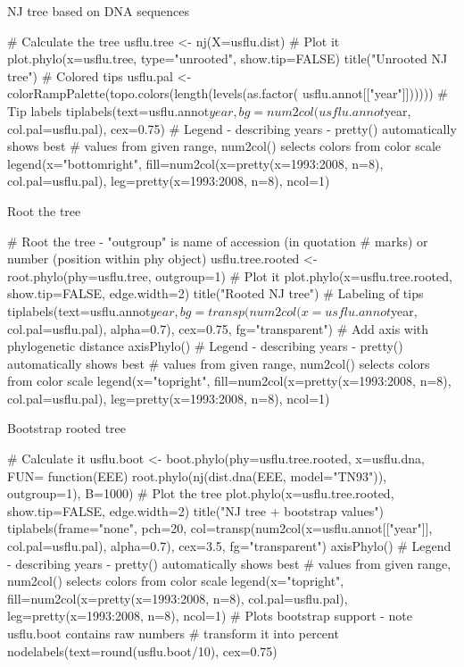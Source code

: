 \documentclass[compress, ucs, xelatex, 11pt, xcolor=svgnames, aspectratio=169,
	hyperref={
		bookmarks=true,
		unicode=true,
		colorlinks=true,
		pdftitle={Molecular data in R},
		plainpages=false,
		pdfauthor={Vojtech Zeisek},
		pdfsubject={Course about phylogeny and evolution in R},
		pdfcreator={XeLaTeX},
		pdfkeywords={R, evolution, phylogeny, molecular data},
		linkcolor=Crimson, %
		anchorcolor=Magenta, %
		citecolor=Magenta, %
		filecolor=Magenta, %
		menucolor=Magenta, %
		urlcolor=DodgerBlue, %
		pdftex},
	url={hyphens, lowtilde} %
	]{beamer}
\begin{document}
\begin{frame}[fragile]{NJ tree based on DNA sequences}
	\begin{spluscode}
    # Calculate the tree
    usflu.tree <- nj(X=usflu.dist)
    # Plot it
    plot.phylo(x=usflu.tree, type="unrooted", show.tip=FALSE)
    title("Unrooted NJ tree")
    # Colored tips
    usflu.pal <- colorRampPalette(topo.colors(length(levels(as.factor(
      usflu.annot[["year"]])))))
    # Tip labels
    tiplabels(text=usflu.annot$year, bg=num2col(usflu.annot$year,
      col.pal=usflu.pal), cex=0.75)
    # Legend - describing years - pretty() automatically shows best
    # values from given range, num2col() selects colors from color scale
    legend(x="bottomright", fill=num2col(x=pretty(x=1993:2008, n=8),
      col.pal=usflu.pal), leg=pretty(x=1993:2008, n=8), ncol=1)
	\end{spluscode}
\end{frame}

\begin{frame}[fragile]{Root the tree}
	\begin{spluscode}
    # Root the tree - "outgroup" is name of accession (in quotation
    # marks) or number (position within phy object)
    usflu.tree.rooted <- root.phylo(phy=usflu.tree, outgroup=1)
    # Plot it
    plot.phylo(x=usflu.tree.rooted, show.tip=FALSE, edge.width=2)
    title("Rooted NJ tree")
    # Labeling of tips
    tiplabels(text=usflu.annot$year, bg=transp(num2col(x=usflu.annot$year,
      col.pal=usflu.pal), alpha=0.7), cex=0.75, fg="transparent")
    # Add axis with phylogenetic distance
    axisPhylo()
    # Legend - describing years - pretty() automatically shows best
    # values from given range, num2col() selects colors from color scale
    legend(x="topright", fill=num2col(x=pretty(x=1993:2008, n=8),
      col.pal=usflu.pal), leg=pretty(x=1993:2008, n=8), ncol=1)
	\end{spluscode}
\end{frame}

\begin{frame}[fragile]{Bootstrap rooted tree}
	\begin{spluscode}
    # Calculate it
    usflu.boot <- boot.phylo(phy=usflu.tree.rooted, x=usflu.dna, FUN=
      function(EEE) root.phylo(nj(dist.dna(EEE, model="TN93")), outgroup=1),
      B=1000)
    # Plot the tree
    plot.phylo(x=usflu.tree.rooted, show.tip=FALSE, edge.width=2)
    title("NJ tree + bootstrap values")
    tiplabels(frame="none", pch=20, col=transp(num2col(x=usflu.annot[["year"]],
      col.pal=usflu.pal), alpha=0.7), cex=3.5, fg="transparent")
    axisPhylo()
    # Legend - describing years - pretty() automatically shows best
    # values from given range, num2col() selects colors from color scale
    legend(x="topright", fill=num2col(x=pretty(x=1993:2008, n=8),
      col.pal=usflu.pal), leg=pretty(x=1993:2008, n=8), ncol=1)
    # Plots bootstrap support - note usflu.boot contains raw numbers
    # transform it into percent
    nodelabels(text=round(usflu.boot/10), cex=0.75)
	\end{spluscode}
\end{frame}
\end{document}
